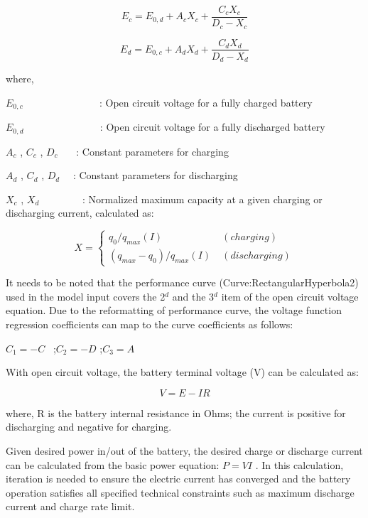 \begin{equation}
{E_c} = {E_{0,d}} + {A_c}{X_c} + \frac{{{C_c}{X_c}}}{{{D_c} - {X_c}}}
\end{equation}

\begin{equation}
{E_d} = {E_{0,c}} + {A_d}{X_d} + \frac{{{C_d}{X_d}}}{{{D_d} - {X_d}}}
\end{equation}

where,

\({E_{0,c}}\) ~~~~~~~~~~~~~~ : Open circuit voltage for a fully charged battery

\({E_{0,d}}\) ~~~~~~~~~~~~~~ : Open circuit voltage for a fully discharged battery

\({A_c}\) , \({C_c}\) , \({D_c}\) ~~~: Constant parameters for charging

\({A_d}\) , \({C_d}\) , \({D_d}\) ~~: Constant parameters for discharging

\({X_c}\) , \({X_d}\) ~~~~~~~~: Normalized maximum capacity at a given charging or discharging current, calculated as:

\begin{equation}
X = \left\{
    \begin{array}{cl}
      q_0 / q_{max}(I) & \; (charging) \\
      (q_{max}-q_0)/q_{max}(I) & \; (discharging)
    \end{array}
  \right.
\end{equation}

It needs to be noted that the performance curve (Curve:RectangularHyperbola2) used in the model input covers the 2\(^{d}\) and the 3\(^{d}\) item of the open circuit voltage equation. Due to the reformatting of performance curve, the voltage function regression coefficients can map to the curve coefficients as follows:

\({C_1} = - C\) ~;\({C_2} = - D\) ;\({C_3} = A\)

With open circuit voltage, the battery terminal voltage (V) can be calculated as:

\begin{equation}
V = E - IR
\end{equation}

where, R is the battery internal resistance in Ohms; the current is positive for discharging and negative for charging.

Given desired power in/out of the battery, the desired charge or discharge current can be calculated from the basic power equation: \(P = VI\) . In this calculation, iteration is needed to ensure the electric current has converged and the battery operation satisfies all specified technical constraints such as maximum discharge current and charge rate limit.

